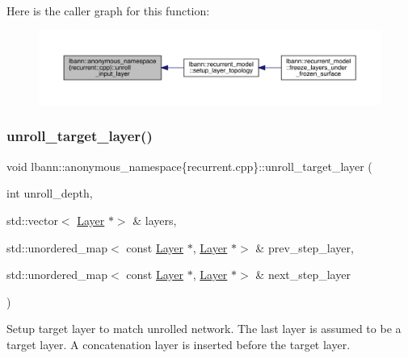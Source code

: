 Here is the caller graph for this function\+:\nopagebreak
\begin{figure}[H]
\begin{center}
\leavevmode
\includegraphics[width=350pt]{namespacelbann_1_1anonymous__namespace_02recurrent_8cpp_03_a8c76387c2dd531058700ad9a41cd093a_icgraph}
\end{center}
\end{figure}
\mbox{\label{namespacelbann_1_1anonymous__namespace_02recurrent_8cpp_03_af04adecd9a62fdcd16ae78b3e95d4bb5}} 
\subsubsection{\texorpdfstring{unroll\+\_\+target\+\_\+layer()}{unroll\_target\_layer()}}
{\footnotesize\ttfamily void lbann\+::anonymous\+\_\+namespace\{recurrent.\+cpp\}\+::unroll\+\_\+target\+\_\+layer (\begin{DoxyParamCaption}\item[{int}]{unroll\+\_\+depth,  }\item[{std\+::vector$<$ \hyperlink{classlbann_1_1Layer}{Layer} $\ast$$>$ \&}]{layers,  }\item[{std\+::unordered\+\_\+map$<$ const \hyperlink{classlbann_1_1Layer}{Layer} $\ast$, \hyperlink{classlbann_1_1Layer}{Layer} $\ast$$>$ \&}]{prev\+\_\+step\+\_\+layer,  }\item[{std\+::unordered\+\_\+map$<$ const \hyperlink{classlbann_1_1Layer}{Layer} $\ast$, \hyperlink{classlbann_1_1Layer}{Layer} $\ast$$>$ \&}]{next\+\_\+step\+\_\+layer }\end{DoxyParamCaption})}

Setup target layer to match unrolled network. The last layer is assumed to be a target layer. A concatenation layer is inserted before the target layer. 

